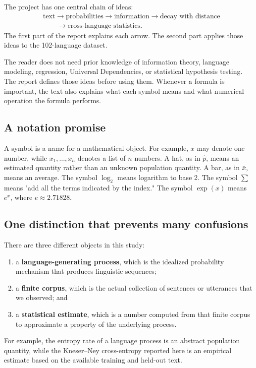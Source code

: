 \documentclass[11pt]{article}
\begin{document}
The project has one central chain of ideas:
\begin{align*}
&\text{text}\to\text{probabilities}\to\text{information}\to\text{decay with distance}\\
&\hspace{2em}\to\text{cross-language statistics}.
\end{align*}
The first part of the report explains each arrow. The second part applies those ideas to the 102-language dataset.

The reader does not need prior knowledge of information theory, language modeling, regression, Universal Dependencies, or statistical hypothesis testing. The report defines those ideas before using them. Whenever a formula is important, the text also explains what each symbol means and what numerical operation the formula performs.\par

\subsection*{A notation promise}
A symbol is a name for a mathematical object. For example, $x$ may denote one number, while $x_1,\ldots,x_n$ denotes a list of $n$ numbers. A hat, as in $\hat p$, means an estimated quantity rather than an unknown population quantity. A bar, as in $\bar x$, means an average. The symbol $\log_2$ means logarithm to base 2. The symbol $\sum$ means "add all the terms indicated by the index." The symbol $\exp(x)$ means $e^x$, where $e\approx2.71828$.

\subsection*{One distinction that prevents many confusions}
There are three different objects in this study:
\begin{enumerate}
\item a \textbf{language-generating process}, which is the idealized probability mechanism that produces linguistic sequences;
\item a \textbf{finite corpus}, which is the actual collection of sentences or utterances that we observed; and
\item a \textbf{statistical estimate}, which is a number computed from that finite corpus to approximate a property of the underlying process.
\end{enumerate}
For example, the entropy rate of a language process is an abstract population quantity, while the Kneser--Ney cross-entropy reported here is an empirical estimate based on the available training and held-out text.
\end{document}

